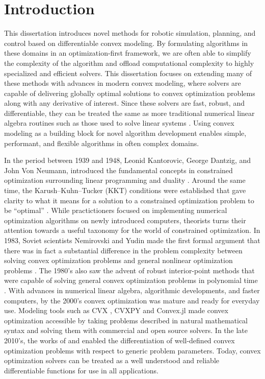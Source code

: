 \chapter{Introduction}

This dissertation introduces novel methods for robotic simulation, planning, and control based on differentiable convex modeling. By formulating algorithms in these domains in an optimization-first framework, we are often able to simplify the complexity of the algorithm and offload computational complexity to highly specialized and efficient solvers. This dissertation focuses on extending many of these methods with advances in modern convex modeling, where solvers are capable of delivering globally optimal solutions to convex optimization problems along with any derivative of interest. Since these solvers are fast, robust, and differentiable, they can be treated the same as more traditional numerical linear algebra routines such as those used to solve linear systems \cite{boyd2004}. Using convex modeling as a building block for novel algorithm development enables simple, performant, and flexible algorithms in often complex domains. 

In the period between 1939 and 1948, Leonid Kantorovic, George Dantzig, and John Von Neumann, introduced the fundamental concepts in constrained optimization surrounding linear programming and duality \cite{dantzig1990}. Around the same time, the Karush–Kuhn–Tucker (KKT) conditions were established that gave clarity to what it means for a solution to a constrained optimization problem to be ``optimal'' \cite{boyd2004}. While practictioners focused on implementing numerical optimization algorithms on newly introduced computers, theorists turns their attention towards a useful taxonomy for the world of constrained optimization. In 1983, Soviet scientists Nemirovski and Yudin made the first formal argument that there was in fact a substantial difference in the problem complexity between solving convex optimization problems and general nonlinear optimization problems \cite{blair1985}. The 1980's also saw the advent of robust interior-point methods that were capable of solving general convex optimization problems in polynomial time \cite{mehrotra1992}. With advances in numerical linear algebra, algorithmic developments, and faster computers, by the 2000's convex optimization was mature and ready for everyday use. Modeling tools such as CVX \cite{grant}, CVXPY \cite{diamond} and Convex.jl \cite{udell2014} made convex optimization accessible by taking problems described in natural mathematical syntax and solving them with commercial and open source solvers. In the late 2010's, the works of \cite{amos2017} and \cite{agrawal2019} enabled the differentiation of well-defined convex optimization problems with respect to generic problem parameters. Today, convex optimization solvers can be treated as a well understood and reliable differentiable functions for use in all applications. 


